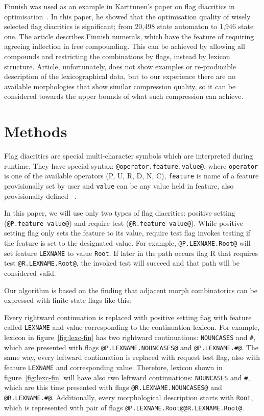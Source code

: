 \documentclass[11pt]{article}
\begin{document}
Finnish was used as an example in Karttunen's paper on flag diacritics in
optimisation~. In this paper, he showed that
the optimisation quality of wisely selected flag diacritics is significant;
from 20,498 state automaton to 1,946 state one. The article describes Finnish
numerals, which have the feature of requiring agreeing inflection in free
compounding. This can be achieved by allowing all compounds and restricting
the combinations by flags, instead by lexicon structure. Article, unfortunately, does not
show examples or re-producible description of the lexicographical
data, but to our experience there are no available morphologies that show
similar compression quality, so it can be considered towards the upper bounds
of what such compression can achieve.
 

\section{Methods}
\label{sec:methods}

Flag diacritics are special multi-character symbols which are interpreted during runtime. They have special syntax: \verb+@operator.feature.value@+, where
\texttt{operator} is one of the available operators (P, U, R, D, N, C), \texttt{feature} is name of a feature provisionally set by user and \texttt{value} can be any value held in feature, also provisionally defined ~\cite{beesley2003finite}.

In this paper, we will use only two types of flag diacritics: positive setting (\verb+@P.feature value@+) and require test (\verb+@R.feature value@+). While positive setting flag only sets the feature to its value, require test flag invokes testing if the feature is set to the designated value.
For example, \verb+@P.LEXNAME.Root@+ will set feature \texttt{LEXNAME} to value \texttt{Root}. If later in the path occurs flag R that requires test \verb+@R.LEXNAME.Root@+, the invoked test will succeed and that path will be considered valid. 

Our algorithm is based on the finding that adjacent morph combinatorics can be expressed with finite-state flags like this:

Every rightward continuation is replaced with positive setting flag with feature called \texttt{LEXNAME} and value corresponding to the continuation lexicon. For example, lexicon in figure~\ref{fig:lexc-fin} has two rightward continuations: \texttt{NOUNCASES} and \texttt{\#}, which are presented with flags \verb+@P.LEXNAME.NOUNCASES@+ and \verb+@P.LEXNAME.#@+. 
The same way, every leftward continuation is replaced with request test flag, also with feature \texttt{LEXNAME} and corresponding value. Therefore, lexicon shown in figure~\ref{fig:lexc-fin} will have also two leftward continuations: \texttt{NOUNCASES} and \texttt{\#}, which are this time presented with flags \verb+@R.LEXNAME.NOUNCASES@+ and \verb+@R.LEXNAME.#@+. Additionally, every morphological description starts with \texttt{Root}, which is represented with pair of flags \verb+@P.LEXNAME.Root@@R.LEXNAME.Root@+.
\end{document}
